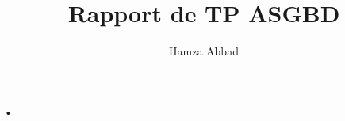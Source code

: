 \documentclass[12pt,a4paper]{article}
\author{Hamza Abbad}
\title{Rapport de TP ASGBD}
\begin{document}
•
\end{document}
